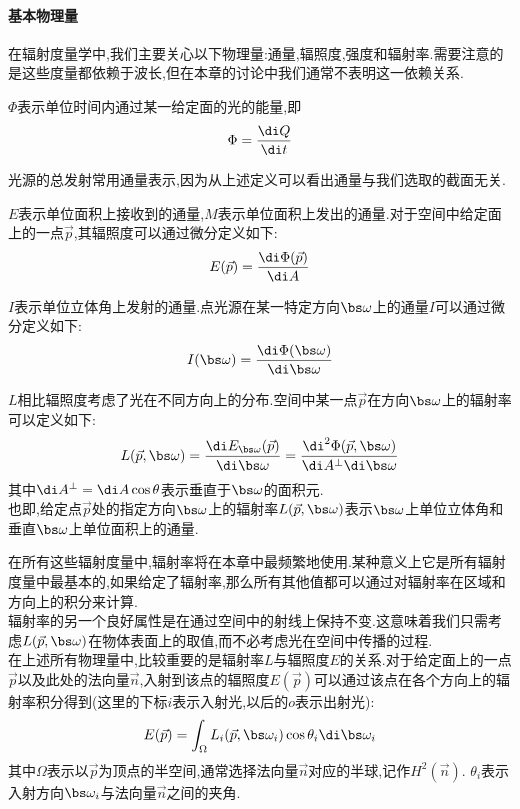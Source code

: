 \documentclass{ctexart}
\begin{document}
\paragraph{基本物理量}
在辐射度量学中,我们主要关心以下物理量:通量,辐照度,强度和辐射率.需要注意的是这些度量都依赖于波长,但在本章的讨论中我们通常不表明这一依赖关系.
\begin{definition}[通量]
    $\Phi$表示单位时间内通过某一给定面的光的能量,即
    \[\Phi=\dfrac{\di Q}{\di t}\]
\end{definition}
光源的总发射常用通量表示,因为从上述定义可以看出通量与我们选取的截面无关.
\begin{definition}[辐照度与辐射出射度]
    $E$表示单位面积上接收到的通量,$M$表示单位面积上发出的通量.对于空间中给定面上的一点$\vec{p}$,其辐照度可以通过微分定义如下:
    \[E(\vec{p})=\dfrac{\di \Phi(\vec{p})}{\di A}\]
\end{definition}
\begin{definition}[强度]
    $I$表示单位立体角上发射的通量.点光源在某一特定方向$\bs\omega$上的通量$I$可以通过微分定义如下:
    \[I(\bs\omega)=\dfrac{\di \Phi(\bs\omega)}{\di\bs\omega}\]
\end{definition}
\begin{definition}[辐射率]
    $L$相比辐照度考虑了光在不同方向上的分布.空间中某一点$\vec{p}$在方向$\bs\omega$上的辐射率可以定义如下:
    \[L(\vec{p},\bs\omega)=\dfrac{\di E_{\bs\omega}(\vec{p})}{\di\bs\omega}=\dfrac{\di^2\Phi(\vec{p},\bs\omega)}{\di A^\bot\di\bs\omega}\]
    其中$\di A^\bot=\di A\cos\theta$表示垂直于$\bs\omega$的面积元.\\
    也即,给定点$\vec{p}$处的指定方向$\bs\omega$上的辐射率$L(\vec{p},\bs\omega)$表示$\bs\omega$上单位立体角和垂直$\bs\omega$上单位面积上的通量.
\end{definition}
在所有这些辐射度量中,辐射率将在本章中最频繁地使用.某种意义上它是所有辐射度量中最基本的,如果给定了辐射率,那么所有其他值都可以通过对辐射率在区域和方向上的积分来计算.\\
\indent 辐射率的另一个良好属性是在通过空间中的射线上保持不变.这意味着我们只需考虑$L(\vec{p},\bs\omega)$在物体表面上的取值,而不必考虑光在空间中传播的过程.\\
\indent 在上述所有物理量中,比较重要的是辐射率$L$与辐照度$E$的关系.对于给定面上的一点$\vec{p}$以及此处的法向量$\vec{n}$,入射到该点的辐照度$E(\vec{p})$可以通过该点在各个方向上的辐射率积分得到(这里的下标$i$表示入射光,以后的$o$表示出射光):
\[E(\vec{p})=\int_{\Omega}L_i(\vec{p},\bs\omega_i)\cos\theta_i\di\bs\omega_i\]
其中$\Omega$表示以$\vec{p}$为顶点的半空间,通常选择法向量$\vec{n}$对应的半球,记作$H^2(\vec{n})$. $\theta_i$表示入射方向$\bs\omega_i$与法向量$\vec{n}$之间的夹角.
\end{document}
